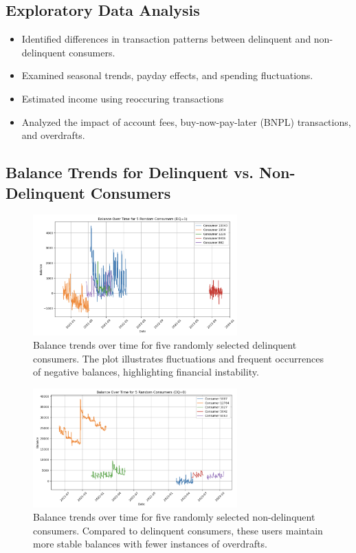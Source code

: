 \documentclass[12pt,letterpaper]{article}
\begin{document}
\subsection{Exploratory Data Analysis}
\begin{itemize}
    \item Identified differences in transaction patterns between delinquent and non-delinquent consumers.
    \item Examined seasonal trends, payday effects, and spending fluctuations.
    \item Estimated income using reoccuring transactions
    \item Analyzed the impact of account fees, buy-now-pay-later (BNPL) transactions, and overdrafts.
\end{itemize}

\subsection{Balance Trends for Delinquent vs. Non-Delinquent Consumers}

\begin{figure}[H]
    \centering
    \includegraphics[width=0.7\textwidth]{figure/balance_delinquent.png}
    \caption{Balance trends over time for five randomly selected delinquent consumers. The plot illustrates fluctuations and frequent occurrences of negative balances, highlighting financial instability.}
    \label{fig:balance_delinquent}
\end{figure}

\begin{figure}[H]
    \centering
    \includegraphics[width=0.7\textwidth]{figure/balance_non_delinquent.png}
    \caption{Balance trends over time for five randomly selected non-delinquent consumers. Compared to delinquent consumers, these users maintain more stable balances with fewer instances of overdrafts.}
    \label{fig:balance_non_delinquent}
\end{figure}
\end{document}
